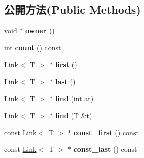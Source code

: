 \subsection*{公開方法(Public Methods)}
\begin{DoxyCompactItemize}
\item 
void $\ast$ {\bfseries owner} ()\hypertarget{class_i_dream_sky_1_1_list_a16eebfd6907625667491e13f585825ca}{}\label{class_i_dream_sky_1_1_list_a16eebfd6907625667491e13f585825ca}

\item 
int {\bfseries count} () const \hypertarget{class_i_dream_sky_1_1_list_ac525e527188a7ac61d6b9599d6b3de5b}{}\label{class_i_dream_sky_1_1_list_ac525e527188a7ac61d6b9599d6b3de5b}

\item 
\hyperlink{class_i_dream_sky_1_1_link}{Link}$<$ T $>$ $\ast$ {\bfseries first} ()\hypertarget{class_i_dream_sky_1_1_list_ac07d24b4da15270974c61640edc53478}{}\label{class_i_dream_sky_1_1_list_ac07d24b4da15270974c61640edc53478}

\item 
\hyperlink{class_i_dream_sky_1_1_link}{Link}$<$ T $>$ $\ast$ {\bfseries last} ()\hypertarget{class_i_dream_sky_1_1_list_a5c6477b6a0d8904cbc5c2503a31098b2}{}\label{class_i_dream_sky_1_1_list_a5c6477b6a0d8904cbc5c2503a31098b2}

\item 
\hyperlink{class_i_dream_sky_1_1_link}{Link}$<$ T $>$ $\ast$ {\bfseries find} (int at)\hypertarget{class_i_dream_sky_1_1_list_afc29490f3ec83baf415331424cfa551d}{}\label{class_i_dream_sky_1_1_list_afc29490f3ec83baf415331424cfa551d}

\item 
\hyperlink{class_i_dream_sky_1_1_link}{Link}$<$ T $>$ $\ast$ {\bfseries find} (T \&t)\hypertarget{class_i_dream_sky_1_1_list_a2c753c10aa40681939fc09a68d2a1442}{}\label{class_i_dream_sky_1_1_list_a2c753c10aa40681939fc09a68d2a1442}

\item 
const \hyperlink{class_i_dream_sky_1_1_link}{Link}$<$ T $>$ $\ast$ {\bfseries const\+\_\+first} () const \hypertarget{class_i_dream_sky_1_1_list_a83fad6ca1b91623de2b8f8e647f1c74d}{}\label{class_i_dream_sky_1_1_list_a83fad6ca1b91623de2b8f8e647f1c74d}

\item 
const \hyperlink{class_i_dream_sky_1_1_link}{Link}$<$ T $>$ $\ast$ {\bfseries const\+\_\+last} () const \hypertarget{class_i_dream_sky_1_1_list_a69c6da2e72d2f3db6b3d735f96fb34c3}{}\label{class_i_dream_sky_1_1_list_a69c6da2e72d2f3db6b3d735f96fb34c3}


\end{DoxyCompactItemize}
